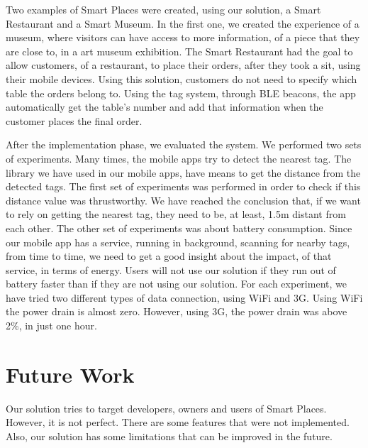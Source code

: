 Two examples of Smart Places were created, using our solution, a Smart Restaurant and a Smart Museum.
In the first one, we created the experience of a museum, where visitors can have access to more information, of a piece that they are close to, in a art museum exhibition.
The Smart Restaurant had the goal to allow customers, of a restaurant, to place their orders, after they took a sit, using their mobile devices.
Using this solution, customers do not need to specify which table the orders belong to. Using the tag system, through \gls{BLE} beacons, the app automatically get the table's number and add that information when the customer places the final order.

After the implementation phase, we evaluated the system.
We performed two sets of experiments.
Many times, the mobile apps try to detect the nearest tag.
The library we have used in our mobile apps, have means to get the distance from the detected tags.
The first set of experiments was performed in order to check if this distance value was thrustworthy.
We have reached the conclusion that, if we want to rely on getting the nearest tag, they need to be, at least, 1.5m distant from each other.
The other set of experiments was about battery consumption.
Since our mobile app has a service, running in background, scanning for nearby tags, from time to time, we need to get a good insight about the impact, of that service, in terms of energy.
Users will not use our solution if they run out of battery faster than if they are not using our solution.
For each experiment, we have tried two different types of data connection, using \gls{WiFi} and \gls{3G}.
Using \gls{WiFi} the power drain is almost zero.
However, using \gls{3G}, the power drain was above 2\%, in just one hour.

\section{Future Work}
\label{sec:conclusion_future_work}
Our solution tries to target developers, owners and users of Smart Places.
However, it is not perfect.
There are some features that were not implemented. Also, our solution has some limitations that can be improved in the future.

